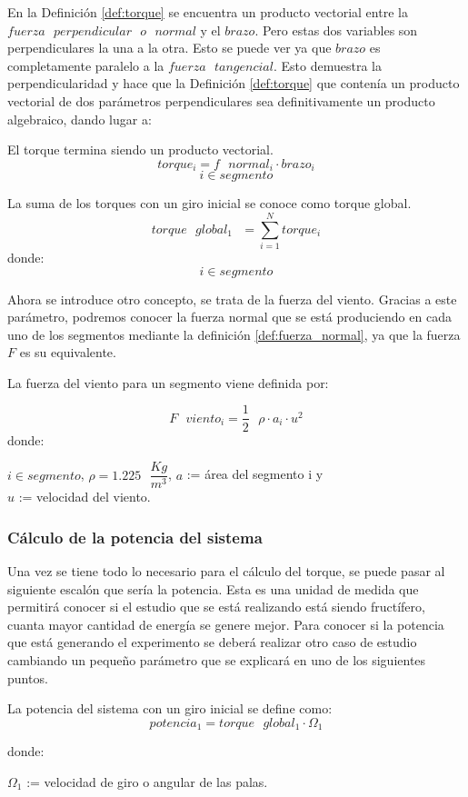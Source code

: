  
 En la Definición \ref{def:torque} se encuentra un producto vectorial entre la $fuerza  \text{ }perpendicular \text{ } o \text{ } normal$ y el $brazo$. Pero estas dos variables son perpendiculares la una a la otra. Esto se puede ver ya que $brazo$ es completamente paralelo a la $fuerza \text{ } tangencial$. Esto demuestra la perpendicularidad y hace que la Definición \ref{def:torque} que contenía un producto vectorial de dos parámetros perpendiculares sea definitivamente un producto algebraico, dando lugar a:
 
  \begin{definicion}
  El torque termina siendo un producto vectorial.
 $$ torque_i = f \text{ } normal_i \cdot brazo_i$$
 $$ i \in segmento$$
 \label{def:torque_vectorial}
 \end{definicion}
 
\begin{definicion}
 La suma de los torques con un giro inicial se conoce como torque global.
 $$ torque \text{ } global_1 \text{ } = \sum_{i=1}^{N} torque_i $$
 donde:
 $$ i \in segmento$$
 \label{def:torque_global}
\end{definicion}

 Ahora se introduce otro concepto, se trata de la fuerza del viento. Gracias a este parámetro, podremos conocer la fuerza normal que se está produciendo en cada uno de los segmentos mediante la definición \ref{def:fuerza_normal}, ya que la fuerza $F$ es su equivalente.
 
 \begin{definicion}
 La fuerza del viento para un segmento viene definida por:
 
 $$ F \text{ } viento_i = \dfrac{1}{2} \text{ } \rho \cdot a_i \cdot u^2$$
 donde:
 
  \centering $i \in segmento$,  $\rho = 1.225 \text{ } \dfrac{Kg}{m^3}$, $a$ := área del segmento i y \\ $u$ := velocidad del viento.
 \label{def:fuerza_viento}
 \end{definicion}
 
 
 \subsubsection{Cálculo de la potencia del sistema}
 
 Una vez se tiene todo lo necesario para el cálculo del torque, se puede pasar al siguiente escalón que sería la potencia. Esta es una unidad de medida que permitirá conocer si el estudio que se está realizando está siendo fructífero, cuanta mayor cantidad de energía se genere mejor. Para conocer si la potencia que está generando el experimento se deberá realizar otro caso de estudio cambiando un pequeño parámetro que se explicará en uno de los siguientes puntos.
 
  \begin{definicion}
 La potencia del sistema con un giro inicial se define como:
 $$ potencia_1 = torque \text{ } global_1 \cdot \Omega_1 $$ 
 
 donde:
 
  \centering $\Omega_1$ := velocidad de giro o angular de las palas.
 \label{def:fuerza_viento}
 \end{definicion}
 
 